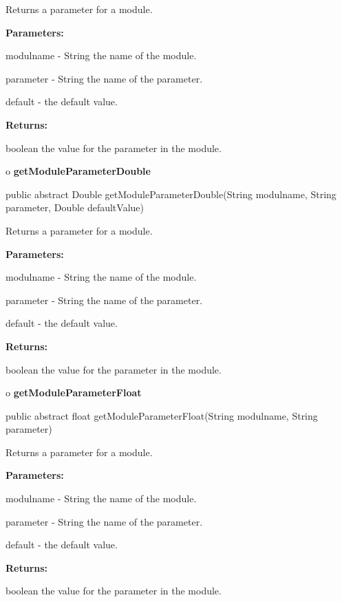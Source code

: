 \begin{description}
\htmlDD Returns a parameter for a module. 

\begin{description}
\item {\bf Parameters:}  

modulname - String the name of the module.  

parameter - String the name of the parameter.  

default - the default value.  
\item {\bf Returns:}  

boolean the value for the parameter in the module.  
\end{description}

\end{description}

o {\bf getModuleParameterDouble} 

\begin{PRE}
 public abstract Double getModuleParameterDouble(String modulname,
                                                 String parameter,
                                                 Double defaultValue)
\end{PRE}

\begin{description}
\htmlDD Returns a parameter for a module. 

\begin{description}
\item {\bf Parameters:}  

modulname - String the name of the module.  

parameter - String the name of the parameter.  

default - the default value.  
\item {\bf Returns:}  

boolean the value for the parameter in the module.  
\end{description}

\end{description}

o {\bf getModuleParameterFloat} 

\begin{PRE}
 public abstract float getModuleParameterFloat(String modulname,
                                               String parameter)
\end{PRE}

\begin{description}
\htmlDD Returns a parameter for a module. 

\begin{description}
\item {\bf Parameters:}  

modulname - String the name of the module.  

parameter - String the name of the parameter.  

default - the default value.  
\item {\bf Returns:}  

boolean the value for the parameter in the module.  
\end{description}

\end{description}

